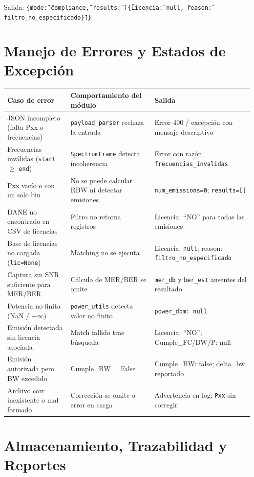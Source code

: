 Salida: \texttt{\{\"mode\": \"compliance\", \"results\": [\{\"Licencia\": null, \"reason\": \"filtro\_no\_especificado\"\}]\}}

\section{Manejo de Errores y Estados de Excepción}

\begin{tabular}{p{5cm}p{5cm}p{4cm}}
\textbf{Caso de error} & \textbf{Comportamiento del módulo} & \textbf{Salida} \\
\hline
JSON incompleto (falta Pxx o frecuencias) & \texttt{payload\_parser} rechaza la entrada & Error 400 / excepción con mensaje descriptivo \\
Frecuencias inválidas (\texttt{start} $\geq$ \texttt{end}) & \texttt{SpectrumFrame} detecta incoherencia & Error con razón \texttt{frecuencias\_invalidas} \\
Pxx vacío o con un solo bin & No se puede calcular RBW ni detectar emisiones & \texttt{num\_emissions=0}; \texttt{results=[]} \\
DANE no encontrado en CSV de licencias & Filtro no retorna registros & Licencia: \enquote{NO} para todas las emisiones \\
Base de licencias no cargada (\texttt{lic=None}) & Matching no se ejecuta & Licencia: \texttt{null}; reason: \texttt{filtro\_no\_especificado} \\
Captura sin SNR suficiente para MER/BER & Cálculo de MER/BER se omite & \texttt{mer\_db} y \texttt{ber\_est} ausentes del resultado \\
Potencia no finita (NaN / $-\infty$) & \texttt{power\_utils} detecta valor no finito & \texttt{power\_dbm: null} \\
Emisión detectada sin licencia asociada & Match fallido tras búsqueda & Licencia: \enquote{NO}; Cumple\_FC/BW/P: null \\
Emisión autorizada pero BW excedido & Cumple\_BW = False & Cumple\_BW: false; delta\_bw reportado \\
Archivo corr inexistente o mal formado & Corrección se omite o error en carga & Advertencia en log; \texttt{Pxx} sin corregir \\
\end{tabular}

\section{Almacenamiento, Trazabilidad y Reportes}

